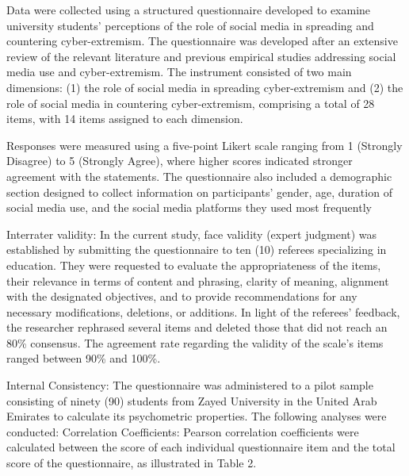 \documentclass[10pt]{NSP1}
\begin{document}
Data were collected using a structured questionnaire developed to examine university students' perceptions of the role of social media in spreading and countering cyber-extremism. The questionnaire was developed after an extensive review of the relevant literature and previous empirical studies addressing social media use and cyber-extremism. The instrument consisted of two main dimensions: (1) the role of social media in spreading cyber-extremism and (2) the role of social media in countering cyber-extremism, comprising a total of 28 items, with 14 items assigned to each dimension.

Responses were measured using a five-point Likert scale ranging from 1 (Strongly Disagree) to 5 (Strongly Agree), where higher scores indicated stronger agreement with the statements. The questionnaire also included a demographic section designed to collect information on participants' gender, age, duration of social media use, and the social media platforms they used most frequently

\par\medskip{}\smallskip

Interrater validity: In the current study, face validity (expert judgment) was established by submitting the questionnaire to ten (10) referees specializing in education. They were requested to evaluate the appropriateness of the items, their relevance in terms of content and phrasing, clarity of meaning, alignment with the designated objectives, and to provide recommendations for any necessary modifications, deletions, or additions. In light of the referees’ feedback, the researcher rephrased several items and deleted those that did not reach an 80\% consensus. The agreement rate regarding the validity of the scale's items ranged between 90\% and 100\%.

Internal Consistency: The questionnaire was administered to a pilot sample consisting of ninety (90) students from Zayed University in the United Arab Emirates to calculate its psychometric properties. The following analyses were conducted: Correlation Coefficients: Pearson correlation coefficients were calculated between the score of each individual questionnaire item and the total score of the questionnaire, as illustrated in Table 2.
\end{document}
